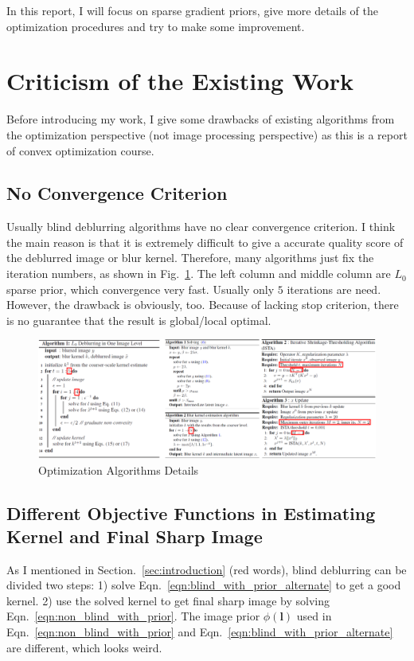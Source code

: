 \documentclass[journal, onecolumn, 10pt]{IEEEtran}
\begin{document}
In this report, I will focus on sparse gradient priors, give more details of the optimization procedures and try to make some improvement.  

\section{Criticism of the Existing Work}
Before introducing my work, I give some drawbacks of existing algorithms from the optimization perspective (not image processing perspective) as this is a report of convex optimization course.

\subsection{No Convergence Criterion}
Usually blind deblurring algorithms have no clear convergence criterion. I think the main reason is that it is extremely difficult to give a accurate quality score of the deblurred image or blur kernel. Therefore, many algorithms just fix the iteration numbers, as shown in Fig.~\ref{fig:optimization_details}. The left column and middle column are $L_0$ sparse prior, which convergence very fast. Usually only $5$ iterations are need. However, the drawback is obviously, too. Because of lacking stop criterion, there is no guarantee that the result is global/local optimal. 
\begin{figure}[h!]
\centering
\includegraphics[width = 1\textwidth]{pic/algorithms.png}
\hspace{\fill}
\caption{Optimization Algorithms Details}
\label{fig:optimization_details}
\end{figure}

\subsection{Different Objective Functions in Estimating Kernel and Final Sharp Image}
As I mentioned in Section.~\ref{sec:introduction} (red words), blind deblurring can be divided two steps: 1) solve Eqn.~\ref{eqn:blind_with_prior_alternate} to get a good kernel. 2) use the solved kernel to get final sharp image by solving Eqn.~\ref{eqn:non_blind_with_prior}. The image prior $\phi(\mathbf{l})$ used in Eqn.~\ref{eqn:non_blind_with_prior} and Eqn.~\ref{eqn:blind_with_prior_alternate} are different, which looks weird. 
\end{document}
